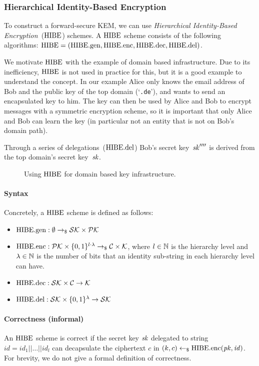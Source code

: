 \subsubsection{Hierarchical Identity-Based Encryption}
\label{sec:hibe}
To construct a forward-secure KEM, we can use \emph{Hierarchical Identity-Based Encryption}~($\mathrm{HIBE}$) schemes.
A $\mathrm{HIBE}$ scheme consists of the following algorithms: $\mathrm{HIBE} = (\mathrm{HIBE}.\mathrm{gen},\mathrm{HIBE}.\mathrm{enc},\mathrm{HIBE}.\mathrm{dec}, \mathrm{HIBE}.\mathrm{del})$.

We motivate $\mathrm{HIBE}$ with the example of domain based infrastructure.
Due to its inefficiency, $\mathrm{HIBE}$ is not used in practice for this, but it is a good example to understand the concept.
In our example Alice only knows the email address of Bob and the public key of the top domain (`\texttt{.de}'), and wants to send an encapsulated key to him.
The key can then be used by Alice and Bob to encrypt messages with a symmetric encryption scheme, so it is important that only Alice and Bob can learn the key (in particular not an entity that is not on Bob's domain path).

Through a series of delegations~($\mathrm{HIBE}.\mathrm{del}$) Bob's secret key~$\mathit{sk}''''$ is derived from the top domain's secret key~$\mathit{sk}$.

\begin{figure}[!ht]
    \centering
    
    \caption{Using $\mathrm{HIBE}$ for domain based key infrastructure.}
    \label{fig:hibe:example}
\end{figure}

\paragraph{Syntax} Concretely, a $\mathrm{HIBE}$ scheme is defined as follows:
\begin{itemize}
    \item $\mathrm{HIBE}.\mathrm{gen} : \emptyset \to_\$ \mathcal{SK}\times\mathcal{PK}$
    \item $\mathrm{HIBE}.\mathrm{enc}: \mathcal{PK}\times\{0,1\}^{l\cdot\lambda} \to_\$ \mathcal{C}\times\mathcal{K}$, where $l\in\mathbb{N}$ is the hierarchy level and $\lambda\in\mathbb{N}$ is the number of bits that an identity sub-string in each hierarchy level can have.
    \item $\mathrm{HIBE}.\mathrm{dec}: \mathcal{SK}\times\mathcal{C} \to \mathcal{K}$
    \item $\mathrm{HIBE}.\mathrm{del}: \mathcal{SK}\times\{0,1\}^\lambda \to \mathcal{SK}$
\end{itemize}

\paragraph{Correctness (informal)} An $\mathrm{HIBE}$ scheme is correct if the secret key $\mathit{sk}$ delegated to string $\mathit{id}=\mathit{id}_1||\dots||\mathit{id}_l$ can decapsulate the ciphertext $c$ in $(k,c) \gets_\$ \mathrm{HIBE}.\mathrm{enc}(\mathit{pk},\mathit{id})$.
For brevity, we do not give a formal definition of correctness.

